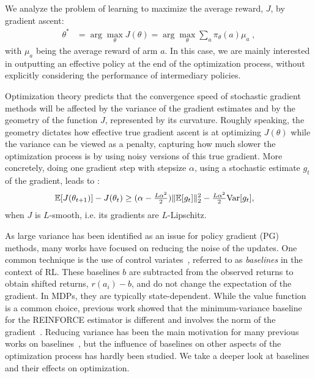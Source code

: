 We analyze the problem of learning to maximize the average reward, $J$, by gradient ascent:
\begin{align}
    \theta^\ast &= \arg\max_\theta J(\theta)
    = \arg\max_\theta \sum_{a} \pi_\theta(a) \mu_a \; , \label{eq:bandit_loss} 
\end{align} 
with $\mu_a$ being the average reward of arm $a$.
In this case, we are mainly interested in outputting an effective policy at the end of the optimization process, without explicitly considering the performance of intermediary policies.%


Optimization theory predicts that the convergence speed of stochastic gradient methods will be affected by the variance of the gradient estimates and by the geometry of the function $J$, represented by its curvature. Roughly speaking, the geometry dictates how effective true gradient ascent is at optimizing $J(\theta)$ while the variance can be viewed as a penalty, capturing how much slower the optimization process is by using noisy versions of this true gradient. More concretely, doing one gradient step with stepsize $\alpha$, using a stochastic estimate $g_t$ of the gradient, leads to \citep{bottou2018optimization}:
\begin{align*}\mathbb{E}[J(\theta_{t+1})] - J(\theta_t) &\geq (\alpha - \tfrac{L \alpha^2}{2}) \|\mathbb{E} [g_t] \|^2_2  - \tfrac{ L \alpha^2}{2} \text{Var}[g_t ],\end{align*}
when $J$ is $L$-smooth, i.e. its gradients are $L$-Lipschitz. 

As large variance has been identified as an issue for policy gradient (PG) methods, many works have focused on reducing the noise of the updates. One common technique is the use of control variates~\citep{greensmith2004variance, hofmann2015variance}, referred to as \emph{baselines} in the context of RL. These baselines $b$ are subtracted from the observed returns to obtain shifted returns, $r(a_i) - b$, and do not change the expectation of the gradient. In MDPs, they are typically state-dependent.
While the value function is a common choice, previous work showed that the minimum-variance baseline for the REINFORCE \citep{williams1992simple} estimator is different and involves the norm of the gradient~\citep{peters2008reinforcement}.
Reducing variance has been the main motivation for many previous works on baselines~\citep[e.g.,][]{gu2016q, liu2017action, grathwohl2017backpropagation, wu2018variance, cheng2020trajectory}, but the influence of baselines on other aspects of the optimization process has hardly been studied. We take a deeper look at baselines and their effects on optimization.

